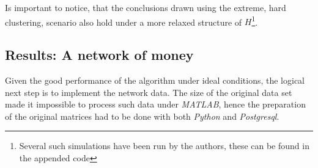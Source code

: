 \documentclass[11pt,letter]{article}%
\numberwithin{equation}{section}
\begin{document}
Is important to notice, that the conclusions drawn using the extreme, hard clustering, scenario also hold under a more relaxed structure of $H$\footnote{Several such simulations have been run by the authors, these can be found in the appended code}.


\subsection{Results: A network of money}


Given the good performance of the algorithm under ideal conditions, the logical next step is to implement the network data. The size of the original data set made it impossible to process such data under \textit{MATLAB}, hence the preparation of the original matrices had to be done with both \textit{Python} and \textit{Postgresql}. 
\end{document}
